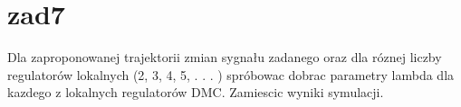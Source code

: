\section{zad7}
\label{projekt:zad7}

Dla zaproponowanej trajektorii zmian sygnału zadanego oraz dla róznej liczby regulatorów
lokalnych (2, 3, 4, 5, . . . ) spróbowac dobrac parametry lambda dla kazdego z lokalnych
regulatorów DMC. Zamiescic wyniki symulacji.

%    



\newpage
